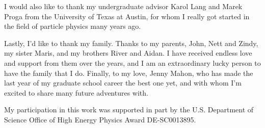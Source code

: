I would also like to thank my undergraduate advisor Karol Lang and Marek Proga from the University of Texas at Austin, for whom I really got started in the field of particle physics many years ago.


Lastly, I'd like to thank my family. Thanks to my parents, John, Nett and Zindy, my sister Maris, and my brothers River and Aidan. I have received endless love and support from them over the years, and I am an extraordinary lucky person to have the family that I do. Finally, to my love, Jenny Mahon, who has made the last year of my graduate school career the best one yet, and with whom I'm excited to share many future adventures with.


My participation in this work was supported in part by the U.S. Department of Science Office of High Energy Physics Award DE-SC0013895.
